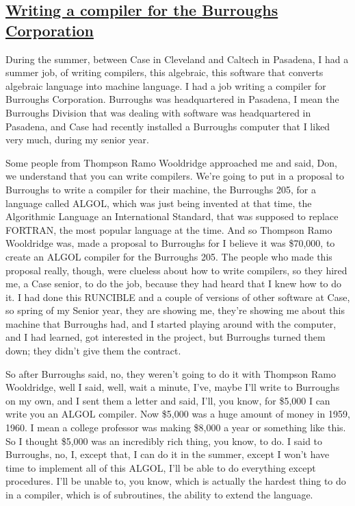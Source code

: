 \documentclass[]{article}
\begin{document}
\subsection{\texorpdfstring{\href{http://webofstories.com/play/17086}{Writing
a compiler for the Burroughs
Corporation}}{Writing a compiler for the Burroughs Corporation}}\label{writing-a-compiler-for-the-burroughs-corporation}

During the summer, between Case in Cleveland and Caltech in Pasadena, I
had a summer job, of writing compilers, this algebraic, this software
that converts algebraic language into machine language. I had a job
writing a compiler for Burroughs Corporation. Burroughs was
headquartered in Pasadena, I mean the Burroughs Division that was
dealing with software was headquartered in Pasadena, and Case had
recently installed a Burroughs computer that I liked very much, during
my senior year.

Some people from Thompson Ramo Wooldridge approached me and said, Don,
we understand that you can write compilers. We're going to put in a
proposal to Burroughs to write a compiler for their machine, the
Burroughs 205, for a language called ALGOL, which was just being
invented at that time, the Algorithmic Language an International
Standard, that was supposed to replace FORTRAN, the most popular
language at the time. And so Thompson Ramo Wooldridge was, made a
proposal to Burroughs for I believe it was \$70,000, to create an ALGOL
compiler for the Burroughs 205. The people who made this proposal
really, though, were clueless about how to write compilers, so they
hired me, a Case senior, to do the job, because they had heard that I
knew how to do it. I had done this RUNCIBLE and a couple of versions of
other software at Case, so spring of my Senior year, they are showing
me, they're showing me about this machine that Burroughs had, and I
started playing around with the computer, and I had learned, got
interested in the project, but Burroughs turned them down; they didn't
give them the contract.

So after Burroughs said, no, they weren't going to do it with Thompson
Ramo Wooldridge, well I said, well, wait a minute, I've, maybe I'll
write to Burroughs on my own, and I sent them a letter and said, I'll,
you know, for \$5,000 I can write you an ALGOL compiler. Now \$5,000 was
a huge amount of money in 1959, 1960. I mean a college professor was
making \$8,000 a year or something like this. So I thought \$5,000 was
an incredibly rich thing, you know, to do. I said to Burroughs, no, I,
except that, I can do it in the summer, except I won't have time to
implement all of this ALGOL, I'll be able to do everything except
procedures. I'll be unable to, you know, which is actually the hardest
thing to do in a compiler, which is of subroutines, the ability to
extend the language.
\end{document}
